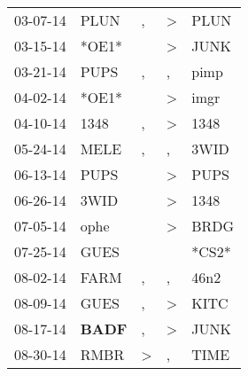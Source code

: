 \begin{supertabular}{p{0.07\textwidth}p{0.06\textwidth}p{0.02\textwidth}p{0.02\textwidth}p{0.06\textwidth}}
          03-07-14\textsuperscript{} &           PLUN\textsuperscript{} &                , &     \textgreater &           PLUN\textsuperscript{} \\
          03-15-14\textsuperscript{} &                            *OE1* &                  &     \textgreater &           JUNK\textsuperscript{} \\
          03-21-14\textsuperscript{} &           PUPS\textsuperscript{} &                , &                , &           pimp\textsuperscript{} \\
          04-02-14\textsuperscript{} &                            *OE1* &                  &     \textgreater &           imgr\textsuperscript{} \\
          04-10-14\textsuperscript{} &           1348\textsuperscript{} &                , &     \textgreater &           1348\textsuperscript{} \\
          05-24-14\textsuperscript{} &           MELE\textsuperscript{} &                , &                , &           3WID\textsuperscript{} \\
          06-13-14\textsuperscript{} &           PUPS\textsuperscript{} &                  &     \textgreater &           PUPS\textsuperscript{} \\
          06-26-14\textsuperscript{} &           3WID\textsuperscript{} &                  &     \textgreater &           1348\textsuperscript{} \\
          07-05-14\textsuperscript{} &           ophe\textsuperscript{} &                  &     \textgreater &           BRDG\textsuperscript{} \\
          07-25-14\textsuperscript{} &           GUES\textsuperscript{} &                  &                  &                            *CS2* \\
          08-02-14\textsuperscript{} &           FARM\textsuperscript{} &                , &                , &           46n2\textsuperscript{} \\
          08-09-14\textsuperscript{} &           GUES\textsuperscript{} &                , &     \textgreater &           KITC\textsuperscript{} \\
          08-17-14\textsuperscript{} &  \textbf{BADF\textsuperscript{}} &                , &     \textgreater &           JUNK\textsuperscript{} \\
          08-30-14\textsuperscript{} &           RMBR\textsuperscript{} &     \textgreater &                , &           TIME\textsuperscript{} \\

\end{supertabular}
